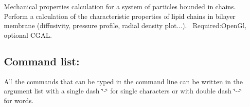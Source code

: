 Mechanical properties calculation for a system of particles bounded in chains. ~\newline
 Perform a calculation of the characteristic properties of lipid chains in bilayer membrane (diffusivity, pressure profile, radial density plot...).~\newline
 Required\+:Open\+Gl, optional C\+G\+AL.\hypertarget{ElPoly_page_CommandList_section}{}\subsection{Command list\+:}\label{ElPoly_page_CommandList_section}
All the commands that can be typed in the command line can be written in the argument list with a single dash \char`\"{}-\/\char`\"{} for single characters or with double dash \char`\"{}-\/-\/\char`\"{} for words.

